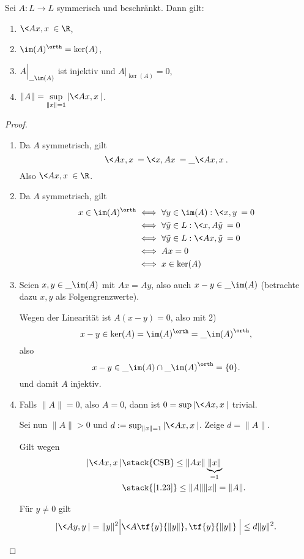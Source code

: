 \begin{st} \label{3.3}
	Sei $A: L \to L$ symmerisch und beschränkt.
	Dann gilt:
	\begin{enumerate}[1)]
		\item
			$\displaystyle \<Ax,x\> \in \R$,
		\item
			$\displaystyle \im(A)^\orth = \ker(A)$,
		\item
			$\displaystyle A \Big|_{\_{\im (A)} }$ ist injektiv und $A \Big|_{\ker(A)} = 0$,
		\item
			$\displaystyle \|A\| = \sup_{\|x\|=1} |\<Ax,x\>|$.
	\end{enumerate}
	\begin{proof}
		\begin{enumerate}[1)]
			\item
				Da $A$ symmetrisch, gilt
				\[
					\<Ax, x\> = \<x, Ax\> = \_{\<Ax,x\>}.
				\]
				Also $\<Ax, x\> \in \R$.
			\item
				Da $A$ symmetrisch, gilt
				\begin{align*}
					x \in \im(A)^\orth
					& \iff \forall y \in \im(A) : \<x,y\> = 0 \\
					& \iff \forall \tilde y \in L: \<x, A\tilde y\> = 0 \\
					& \iff \forall \tilde y \in L: \<Ax,\tilde y\> = 0 \\
					& \iff Ax = 0 \\
					& \iff x \in \ker(A)
				\end{align*}
			\item
				Seien $x,y \in \_{\im(A)}$ mit $Ax = Ay$, also auch $x-y \in \_{\im(A)}$ (betrachte dazu $x,y$ als Folgengrenzwerte).

				Wegen der Linearität ist $A(x-y) = 0$, also mit 2)
				\[
					x-y \in \ker (A) = \im(A)^\orth = \_{\im(A)}^\orth,
				\]
				also
				\[
					x-y \in \_{\im(A)} \cap \_{\im(A)}^\orth = \{0\}.
				\]
				und damit $A$ injektiv.
			\item
				Falls $\|A\| = 0$, also $A=0$, dann ist $0 = \sup |\<Ax,x\>|$ trivial.

				Sei nun $\|A\| > 0$ und $d := \sup_{\|x\|=1} |\<Ax,x\>|$.
				Zeige $d = \|A\|$.
				\begin{seg}[$d \le \|A\|$:]
					Gilt wegen
					\begin{align*}
							|\<Ax,x\>|
							&\stack{\text{CSB}} \le \|Ax\| \underbrace{\|x\|}_{=1} \\
							&\stack{\ref{1.23}}\le \|A\| \|x\|
							= \|A\|.
					\end{align*}
				\end{seg}
				\begin{seg}[$d \ge \|A\|$:]
					Für $y \neq 0$ gilt
					\[
						|\<Ay,y\>| 
						= \|y\|^2 \Big| \< A \tf{y}{\|y\|}, \tf{y}{\|y\|} \> \Big| 
						\le d\|y\|^2.
					\]


\end{seg}
\end{enumerate}
\end{proof}
\end{st}
